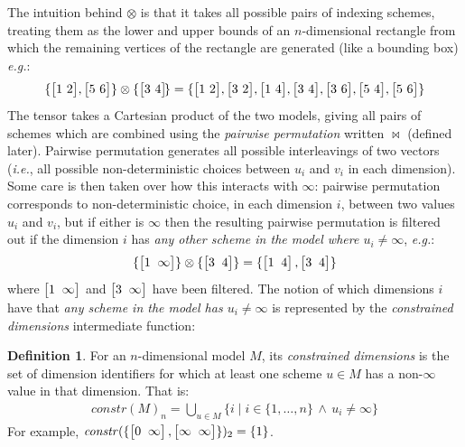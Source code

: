 \documentclass[9pt,preprint]{sigplanconf}
\newcounter{block}
\theoremstyle{definition}
\newtheorem{definition}[block]{Definition}
\newcommand{\ie}{\emph{i.e.}}
\newcommand{\eg}{\emph{e.g.}}
\newcommand{\vtwohs}[2]{\setlength{\arraycolsep}{0em}
\left[\begin{array}{cc}#1 \, & \, #2\end{array}\right]\!}
\newcommand{\vtwoh}[2]{\setlength{\arraycolsep}{0em}
\left[\begin{array}{cc}#1 \; & \; #2\end{array}\right]}
\newcommand{\effdims}[2]{\mathit{constr}(#1)_{#2}}
\begin{document}
The intuition behind $\otimes$ is that it takes
all possible pairs of indexing schemes, treating them as the
lower and upper bounds of an $n$-dimensional rectangle from which the
remaining vertices of the rectangle are generated (like a bounding
box) \eg{}:
\begin{align*}
\{\vtwohs{1}{2}, \vtwohs{5}{6}\,\} \otimes \{\vtwohs{3}{4}\} =
\{\vtwohs{1}{2}, \vtwohs{3}{2}, \vtwohs{1}{4}, \vtwohs{3}{4}, 
   \vtwohs{3}{6}, \vtwohs{5}{4}, \vtwohs{5}{6}\,\}
\end{align*}
The tensor takes a Cartesian product of the two models,
giving all pairs of schemes which are combined using the
\emph{pairwise permutation} written $\bowtie$ (defined later).
Pairwise permutation generates all possible interleavings of two vectors
(\ie{}, all possible non-deterministic choices between $u_i$ and
$v_i$ in each dimension). Some care is then taken over
how this interacts with $\infty$: pairwise permutation
corresponds to non-deterministic choice, in each dimension $i$,
between two values $u_i$ and $v_i$, but if either
is $\infty$ then the resulting pairwise permutation is
filtered out if the dimension $i$ has \emph{any other scheme
in the model where $u_i \neq \infty$}, \eg{}:
\begin{align*}
\{\vtwoh{1}{\infty}\} \otimes \{\vtwoh{3}{4}\} =
\{\vtwoh{1}{4}, \vtwoh{3}{4}\}
\end{align*}
%
where $\vtwoh{1}{\infty}$ and $\vtwoh{3}{\infty}$ have been filtered.
%
%
%
The notion of which dimensions $i$ have that \emph{any scheme in the model
has $u_i \neq \infty$} is represented by the \emph{constrained
dimensions} intermediate function:
%
\begin{definition}%
For an $n$-dimensional model $M$, its \emph{constrained dimensions}
is the set of dimension identifiers for which at least one scheme $u \in M$ has
a non-$\infty$ value in that dimension. That is:
%
\begin{align*}
\effdims{M}{n} =
\bigcup_{u \in M} \{i \mid i \in \{1,\ldots,n\} \, \wedge \, u_i \neq
  \infty\}
\end{align*}
For example, $\effdims{\{\vtwoh{0}{\infty},\vtwoh{\infty}{\infty}\}}{2}
 = \{1\}$.
\end{definition}
\end{document}
